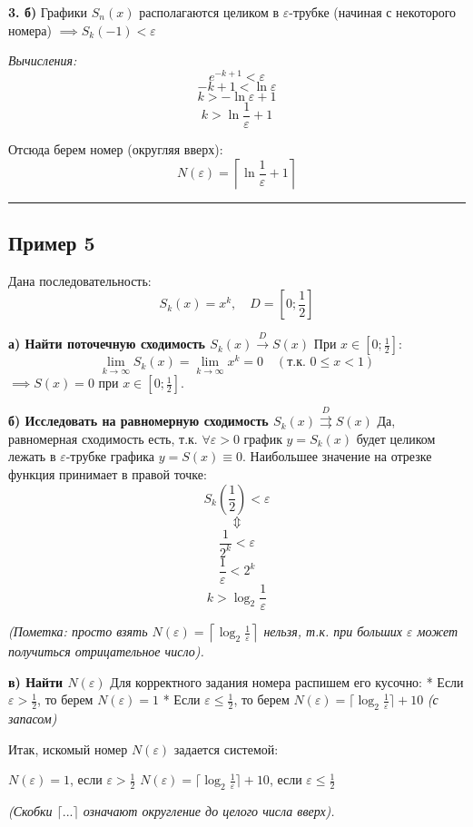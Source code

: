 \documentclass[
  12pt,
  oneside,
  openany]{book}
\begin{document}
\textbf{3. б)} Графики \(S_n(x)\) располагаются целиком в
\(\varepsilon\)-трубке (начиная с некоторого номера)
\(\implies S_k(-1) < \varepsilon\)

\emph{Вычисления:} \[e^{-k+1} < \varepsilon\]
\[-k + 1 < \ln \varepsilon\] \[k > -\ln \varepsilon + 1\]
\[k > \ln \frac{1}{\varepsilon} + 1\]

Отсюда берем номер (округляя вверх):
\[N(\varepsilon) = \left\lceil \ln \frac{1}{\varepsilon} + 1 \right\rceil\]

\begin{center}\rule{0.5\linewidth}{0.5pt}\end{center}

\subsection{Пример 5}\label{ux43fux440ux438ux43cux435ux440-5}

Дана последовательность:
\[S_k(x) = x^k, \quad D = \left[0; \frac{1}{2}\right]\]

\textbf{а) Найти поточечную сходимость \(S_k(x) \xrightarrow{D} S(x)\)}
При \(x \in \left[0; \frac{1}{2}\right]\):
\[\lim_{k \to \infty} S_k(x) = \lim_{k \to \infty} x^k = 0 \quad (\text{т.к. } 0 \le x < 1)\]
\(\implies S(x) = 0\) при \(x \in \left[0; \frac{1}{2}\right]\).

\textbf{б) Исследовать на равномерную сходимость
\(S_k(x) \overset{D}{\rightrightarrows} S(x)\)} Да, равномерная
сходимость есть, т.к. \(\forall \varepsilon > 0\) график \(y = S_k(x)\)
будет целиком лежать в \(\varepsilon\)-трубке графика
\(y = S(x) \equiv 0\). Наибольшее значение на отрезке функция принимает
в правой точке: \[S_k\left(\frac{1}{2}\right) < \varepsilon\]
\[\Updownarrow\] \[\frac{1}{2^k} < \varepsilon\]
\[\frac{1}{\varepsilon} < 2^k\] \[k > \log_2 \frac{1}{\varepsilon}\]

\emph{(Пометка: просто взять
\(N(\varepsilon) = \left\lceil \log_2 \frac{1}{\varepsilon} \right\rceil\)
нельзя, т.к. при больших \(\varepsilon\) может получиться отрицательное
число).}

\textbf{в) Найти \(N(\varepsilon)\)} Для корректного задания номера
распишем его кусочно: * Если \(\varepsilon > \frac{1}{2}\), то берем
\(N(\varepsilon) = 1\) * Если \(\varepsilon \le \frac{1}{2}\), то берем
\(N(\varepsilon) = \lceil \log_2 \frac{1}{\varepsilon} \rceil + 10\)
\emph{(с запасом)}

Итак, искомый номер \(N(\varepsilon)\) задается системой:

\(N(\varepsilon) = 1\), если \(\varepsilon > \frac{1}{2}\)
\(N(\varepsilon) = \lceil \log_2 \frac{1}{\varepsilon} \rceil + 10\),
если \(\varepsilon \le \frac{1}{2}\)

\emph{(Скобки \(\lceil ... \rceil\) означают округление до целого числа
вверх).}

\backmatter
\end{document}
